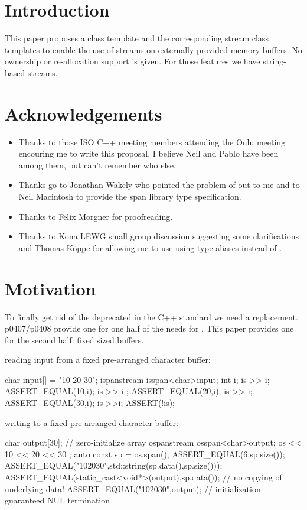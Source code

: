 \documentclass[ebook,11pt,article]{memoir}
\begin{document}
\chapter{Introduction}
This paper proposes a class template  and the corresponding stream class templates to enable the use of streams on externally provided memory buffers. No ownership or re-allocation support is given. For those features we have string-based streams.

\chapter{Acknowledgements}
\begin{itemize}
\item Thanks to those ISO C++ meeting members attending the Oulu meeting encouring me to write this proposal. I believe Neil and Pablo have been among them, but can't remember who else.
\item Thanks go to Jonathan Wakely who pointed the problem of  out to me and to Neil Macintosh to provide the span library type specification.
\item Thanks to Felix Morgner for proofreading.
\item Thanks to Kona LEWG small group discussion suggesting some clarifications and Thomas K\"oppe for allowing me to use using type aliases instead of .
\end{itemize}

\chapter{Motivation}
To finally get rid of the deprecated  in the C++ standard we need a replacement. p0407/p0408 provide one for one half of the needs for . This paper provides one for the second half: fixed sized buffers. 

\begin{example} reading input from a fixed pre-arranged character buffer:
\begin{codeblock}
char input[] = "10 20 30";
ispanstream is{span<char>{input}};
int i;
is >> i;
ASSERT_EQUAL(10,i);
is >> i ;
ASSERT_EQUAL(20,i);
is >> i;
ASSERT_EQUAL(30,i);
is >>i;
ASSERT(!is);
\end{codeblock}
\end{example}
\begin{example} writing to a fixed pre-arranged character buffer:
\begin{codeblock}
char  output[30]{}; // zero-initialize array
ospanstream os{span<char>{output}};
os << 10 << 20 << 30 ;
auto const sp = os.span();
ASSERT_EQUAL(6,sp.size());
ASSERT_EQUAL("102030",std::string(sp.data(),sp.size()));
ASSERT_EQUAL(static_cast<void*>(output),sp.data()); // no copying of underlying data!
ASSERT_EQUAL("102030",output); // initialization guaranteed NUL termination
\end{codeblock}
\end{example}
\end{document}
